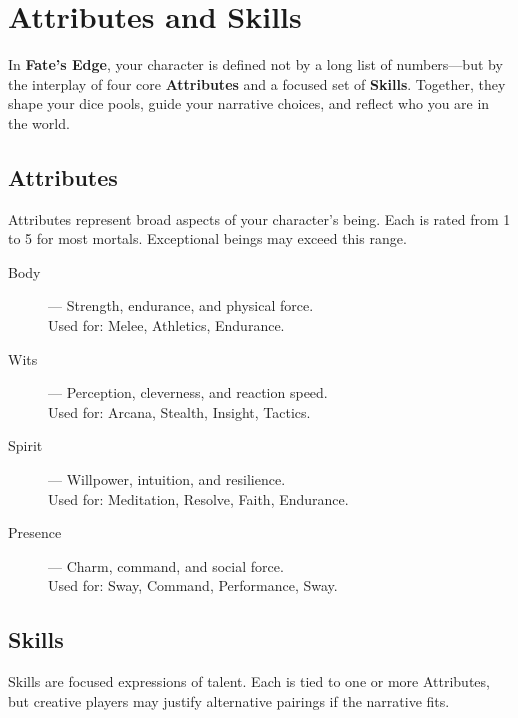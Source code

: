 
\chapter{Attributes and Skills}
\label{ch:attributes-skills}

In \textbf{Fate's Edge}, your character is defined not by a long list of numbers—but by the interplay of four core \textbf{Attributes} and a focused set of \textbf{Skills}. Together, they shape your dice pools, guide your narrative choices, and reflect who you are in the world.

\section{Attributes}

Attributes represent broad aspects of your character's being. Each is rated from 1 to 5 for most mortals. Exceptional beings may exceed this range.

\begin{description}
  \item[Body]  — Strength, endurance, and physical force. \\
    Used for: Melee, Athletics, Endurance.

  \item[Wits]  — Perception, cleverness, and reaction speed. \\
    Used for: Arcana, Stealth, Insight, Tactics.

  \item[Spirit]  — Willpower, intuition, and resilience. \\
    Used for: Meditation, Resolve, Faith, Endurance.

  \item[Presence]  — Charm, command, and social force. \\
    Used for: Sway, Command, Performance, Sway.
\end{description}

\section{Skills}

Skills are focused expressions of talent. Each is tied to one or more Attributes, but creative players may justify alternative pairings if the narrative fits.

